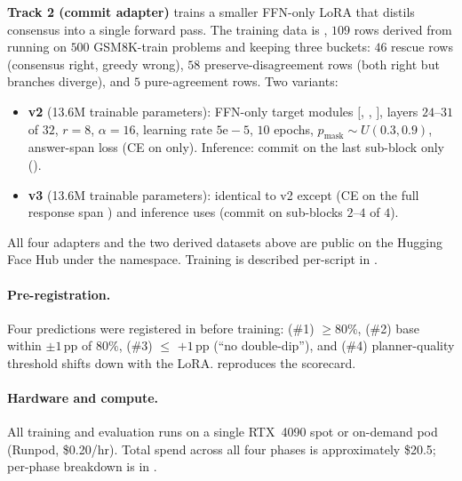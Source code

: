 \textbf{Track 2 (commit adapter)} trains a smaller FFN-only LoRA
that distils \cmaj{} consensus into a single forward pass.  The
training data is , $109$
rows derived from running \cmaj{} on $500$ GSM8K-train problems and
keeping three buckets: $46$ rescue rows (consensus right, greedy
wrong), $58$ preserve-disagreement rows (both right but branches
diverge), and $5$ pure-agreement rows.  Two variants:

\begin{itemize}
    \item \textbf{v2} (13.6M trainable parameters): FFN-only target
          modules $[$, ,
          $]$, layers $24\text{--}31$ of $32$, $r{=}8$,
          $\alpha{=}16$, learning rate $5\mathrm{e}{-}5$, $10$ epochs,
          $p_\text{mask} \sim U(0.3, 0.9)$, answer-span loss
          (CE on \code{[answer\_start, answer\_end)} only).
          Inference: commit on the last sub-block only
          ().
    \item \textbf{v3} (13.6M trainable parameters): identical to v2
          except  (CE on the full
          response span \code{[prompt\_len, response\_end)}) and
          inference uses  (commit on
          sub-blocks $2\text{--}4$ of $4$).
\end{itemize}

All four adapters and the two derived datasets above are public on
the Hugging Face Hub under the  namespace.  Training
is described per-script in .

\paragraph{Pre-registration.}
Four predictions were registered in  before
training: (\#1) \ctwoc{} $\geq 80\%$, (\#2) base \cmaj{} within
$\pm 1$\,pp of $80\%$, (\#3) \cmajc{} $\leq$ \cmaj{} $+ 1$\,pp
(``no double-dip''), and (\#4) planner-quality threshold shifts
down with the LoRA.   reproduces the scorecard.

\paragraph{Hardware and compute.}
All training and evaluation runs on a single RTX~4090 spot or
on-demand pod (Runpod, \$0.20/hr).  Total spend across all four
phases is approximately \$20.5; per-phase breakdown is in
.
